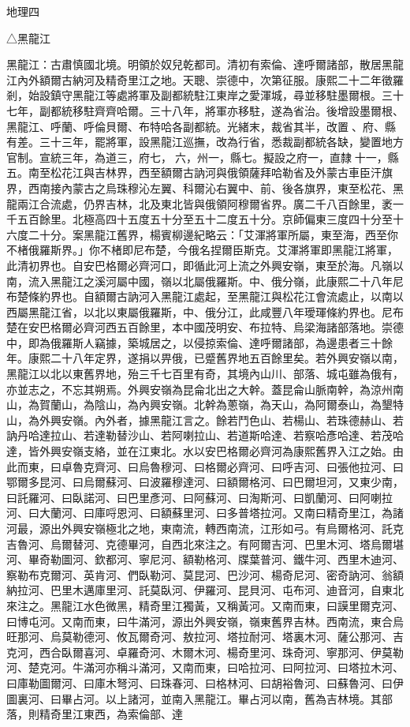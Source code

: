 
\begin{pinyinscope}
地理四

△黑龍江

黑龍江：古肅慎國北境。明領於奴兒乾都司。清初有索倫、達呼爾諸部，散居黑龍江內外額爾古納河及精奇里江之地。天聰、崇德中，次第征服。康熙二十二年徵羅剎，始設鎮守黑龍江等處將軍及副都統駐江東岸之愛渾城，尋並移駐墨爾根。三十七年，副都統移駐齊齊哈爾。三十八年，將軍亦移駐，遂為省治。後增設墨爾根、黑龍江、呼蘭、呼倫貝爾、布特哈各副都統。光緒末，裁省其半，改置、府、縣有差。三十三年，罷將軍，設黑龍江巡撫，改為行省，悉裁副都統各缺，變置地方官制。宣統三年，為道三，府七，六，州一，縣七。擬設之府一，直隸十一，縣五。南至松花江與吉林界，西至額爾古訥河與俄領薩拜哈勒省及外蒙古車臣汗旗界，西南接內蒙古之烏珠穆沁左翼、科爾沁右翼中、前、後各旗界，東至松花、黑龍兩江合流處，仍界吉林，北及東北皆與俄領阿穆爾省界。廣二千八百餘里，袤一千五百餘里。北極高四十五度五十分至五十二度五十分。京師偏東三度四十分至十六度二十分。案黑龍江舊界，楊賓柳邊紀略云：「艾渾將軍所屬，東至海，西至你不楮俄羅斯界。」你不楮即尼布楚，今俄名捏爾臣斯克。艾渾將軍即黑龍江將軍，此清初界也。自安巴格爾必齊河口，即循此河上流之外興安嶺，東至於海。凡嶺以南，流入黑龍江之溪河屬中國，嶺以北屬俄羅斯。中、俄分嶺，此康熙二十八年尼布楚條約界也。自額爾古訥河入黑龍江處起，至黑龍江與松花江會流處止，以南以西屬黑龍江省，以北以東屬俄羅斯，中、俄分江，此咸豐八年璦琿條約界也。尼布楚在安巴格爾必齊河西五百餘里，本中國茂明安、布拉特、烏梁海諸部落地。崇德中，即為俄羅斯人竊據，築城居之，以侵掠索倫、達呼爾諸部，為邊患者三十餘年。康熙二十八年定界，遂捐以畀俄，已蹙舊界地五百餘里矣。若外興安嶺以南，黑龍江以北以東舊界地，殆三千七百里有奇，其境內山川、部落、城屯雖為俄有，亦並志之，不忘其朔焉。外興安嶺為昆侖北出之大幹。蓋昆侖山脈南幹，為涼州南山，為賀蘭山，為陰山，為內興安嶺。北幹為蔥嶺，為天山，為阿爾泰山，為墾特山，為外興安嶺。內外者，據黑龍江言之。餘若鬥色山、若楊山、若珠德赫山、若訥丹哈達拉山、若達勒替沙山、若阿喇拉山、若道斯哈達、若察哈彥哈達、若茂哈達，皆外興安嶺支絡，並在江東北。水以安巴格爾必齊河為康熙舊界入江之始。由此而東，曰卓魯克齊河、曰烏魯穆河、曰格爾必齊河、曰呼吉河、曰張他拉河、曰鄂爾多昆河、曰烏爾蘇河、曰波羅穆達河、曰額爾格河、曰巴爾坦河，又東少南，曰託羅河、曰臥諾河、曰巴里彥河、曰阿蘇河、曰淘斯河、曰凱蘭河、曰阿喇拉河、曰大蘭河、曰庫哷恩河、曰額蘇里河、曰多普塔拉河。又南曰精奇里江，為諸河最，源出外興安嶺極北之地，東南流，轉西南流，江形如弓。有烏爾格河、託克吉魯河、烏爾替河、克德畢河，自西北來注之。有阿爾吉河、巴里木河、塔烏爾堪河、畢奇勒圖河、欽都河、寧尼河、額勒格河、牒葉普河、鐵牛河、西里木迪河、察勒布克爾河、英肯河、們臥勒河、莫昆河、巴沙河、楊奇尼河、密奇訥河、翁額納拉河、巴里木邁庫里河、託莫臥河、伊羅河、昆貝河、屯布河、迪音河，自東北來注之。黑龍江水色微黑，精奇里江獨黃，又稱黃河。又南而東，曰謨里爾克河、曰博屯河。又南而東，曰牛滿河，源出外興安嶺，嶺東舊界吉林。西南流，東合烏旺那河、烏莫勒德河、攸瓦爾奇河、敖拉河、塔拉耐河、塔裏木河、薩公那河、吉克河，西合臥爾喜河、卓羅奇河、木爾木河、楊奇里河、珠奇河、寧那河、伊莫勒河、楚克河。牛滿河亦稱斗滿河，又南而東，曰哈拉河、曰阿拉河、曰塔拉木河、曰庫勒圖爾河、曰庫木弩河、曰珠春河、曰格林河、曰胡裕魯河、曰蘇魯河、曰伊圖裏河、曰畢占河。以上諸河，並南入黑龍江。畢占河以南，舊為吉林境。其部落，則精奇里江東西，為索倫部、達
\end{pinyinscope}
